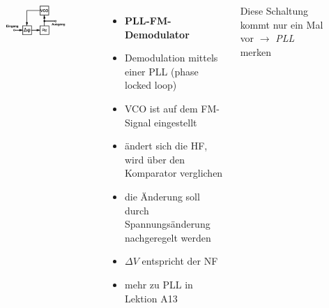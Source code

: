 \begin{frame}
  \begin{columns}
    \begin{figure}
      \includegraphics[width=\textwidth,height=.85\textheight,keepaspectratio]{a12/td509.png}
    \end{figure}
    \begin{itemize}
      \item \textbf{PLL-FM-Demodulator}
      \item Demodulation mittels einer PLL (phase locked loop)
      \item VCO ist auf dem FM-Signal eingestellt
      \item ändert sich die HF, wird über den Komparator verglichen
      \item die Änderung soll durch Spannungsänderung nachgeregelt werden
      \item $\Delta V$ entspricht der NF
      \item mehr zu PLL in Lektion A13
    \end{itemize}
    {\small Diese Schaltung kommt nur ein Mal vor $\rightarrow$ \emph{PLL} merken}
  \end{columns}
\end{frame}

